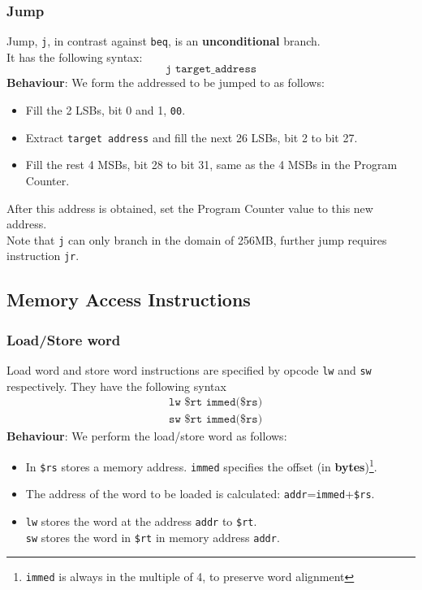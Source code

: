 \documentclass[12pt]{article}
\theoremstyle{definition}
\begin{document}
\subsubsection{Jump}
Jump, \texttt{j}, in contrast against \texttt{beq}, is an \textbf{unconditional} branch.\\
It has the following syntax:
\[
\texttt{j target\_address}
\]
\textbf{Behaviour}: We form the addressed to be jumped to as follows:
\begin{itemize}
  \item Fill the 2 LSBs, bit 0 and 1, \texttt{00}.%
  \item Extract \texttt{target address} and fill the next 26 LSBs, bit 2 to bit 27.
  \item Fill the rest 4 MSBs, bit 28 to bit 31, same as the 4 MSBs in the Program Counter.
\end{itemize}
After this address is obtained, set the Program Counter value to this new address.\\
Note that \texttt{j} can only branch in the domain of 256MB, further jump requires instruction \texttt{jr}.
\subsection{Memory Access Instructions}
\subsubsection{Load/Store word}
Load word and store word instructions are specified by opcode \texttt{lw} and \texttt{sw} respectively. They have the following syntax
\begin{align*}
&\texttt{lw \$rt immed(\$rs)}\\
&\texttt{sw \$rt immed(\$rs)}
\end{align*}
\textbf{Behaviour}: We perform the load/store word as follows:
\begin{itemize}
  \item In \texttt{\$rs} stores a memory address. \texttt{immed} specifies the offset (in \textbf{bytes})\footnote{\texttt{immed} is always in the multiple of 4, to preserve word alignment}.
  \item The address of the word to be loaded is calculated: \texttt{addr}=\texttt{immed}+\texttt{\$rs}.
  \item \texttt{lw} stores the word at the address \texttt{addr} to \texttt{\$rt}.\\\texttt{sw} stores the word in \texttt{\$rt} in memory address \texttt{addr}.
\end{itemize}
\end{document}
